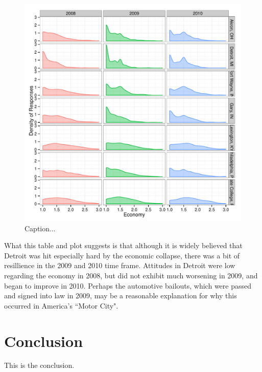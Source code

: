 \documentclass[11pt]{article}\usepackage{knitr}
\begin{document}
\begin{knitrout}
\color{fgcolor}\begin{figure}[H]


{\centering \includegraphics[width=\maxwidth]{figure/rb_one} 

}

\caption[Caption]{Caption...\label{fig:rb_one}}
\end{figure}


\end{knitrout}


What this table and plot suggests is that although it is widely believed that Detroit was hit especially hard by the economic collapse, there was a bit of resillience in the 2009 and 2010 time frame. Attitudes in Detroit were low regarding the economy in 2008, but did not exhibit much worsening in 2009, and began to improve in 2010. Perhaps the automotive bailouts, which were passed and signed into law in 2009, may be a reasonable explanation for why this occurred in America's ``Motor City".


\section*{Conclusion}

This is the conclusion.


\printbibliography
\end{document}
